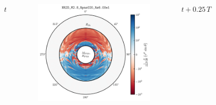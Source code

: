 \documentclass{beamer}
\begin{document}
\begin{frame}
\begin{columns}[c]
  \end{columns}

\end{frame}


%
%


\begin{frame}

  \begin{columns}[c]

      \centerline{$t$}
      \begin{figure}[htb!]
        \centering
        \includegraphics[width=\textwidth]{fig.DivV2_0.00T.png}
      \end{figure}
      \centerline{$t+0.25\,T$}
      \begin{figure}[htb!]
        \centering

\end{figure}
\end{columns}
\end{frame}
\end{document}
